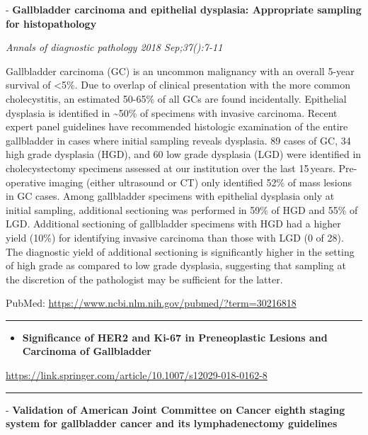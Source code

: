 \documentclass[]{article}
\providecommand{\tightlist}{%
  \setlength{\itemsep}{0pt}\setlength{\parskip}{0pt}}
\begin{document}
 - \textbf{Gallbladder carcinoma and epithelial dysplasia: Appropriate
sampling for histopathology}

\emph{Annals of diagnostic pathology 2018 Sep;37():7-11}

Gallbladder carcinoma (GC) is an uncommon malignancy with an overall
5-year survival of \textless{}5\%. Due to overlap of clinical
presentation with the more common cholecystitis, an estimated 50-65\% of
all GCs are found incidentally. Epithelial dysplasia is identified in
\textasciitilde{}50\% of specimens with invasive carcinoma. Recent
expert panel guidelines have recommended histologic examination of the
entire gallbladder in cases where initial sampling reveals dysplasia. 89
cases of GC, 34 high grade dysplasia (HGD), and 60 low grade dysplasia
(LGD) were identified in cholecystectomy specimens assessed at our
institution over the last 15\,years. Pre-operative imaging (either
ultrasound or CT) only identified 52\% of mass lesions in GC cases.
Among gallbladder specimens with epithelial dysplasia only at initial
sampling, additional sectioning was performed in 59\% of HGD and 55\% of
LGD. Additional sectioning of gallbladder specimens with HGD had a
higher yield (10\%) for identifying invasive carcinoma than those with
LGD (0 of 28). The diagnostic yield of additional sectioning is
significantly higher in the setting of high grade as compared to low
grade dysplasia, suggesting that sampling at the discretion of the
pathologist may be sufficient for the latter.

PubMed: \url{https://www.ncbi.nlm.nih.gov/pubmed/?term=30216818}

{}

{}

\begin{center}\rule{0.5\linewidth}{\linethickness}\end{center}

\begin{itemize}
\tightlist
\item
  \textbf{Significance of HER2 and Ki-67 in Preneoplastic Lesions and
  Carcinoma of Gallbladder}
\end{itemize}

\url{https://link.springer.com/article/10.1007/s12029-018-0162-8}

\begin{center}\rule{0.5\linewidth}{\linethickness}\end{center}

 - \textbf{Validation of American Joint Committee on Cancer eighth
staging system for gallbladder cancer and its lymphadenectomy
guidelines}
\end{document}
